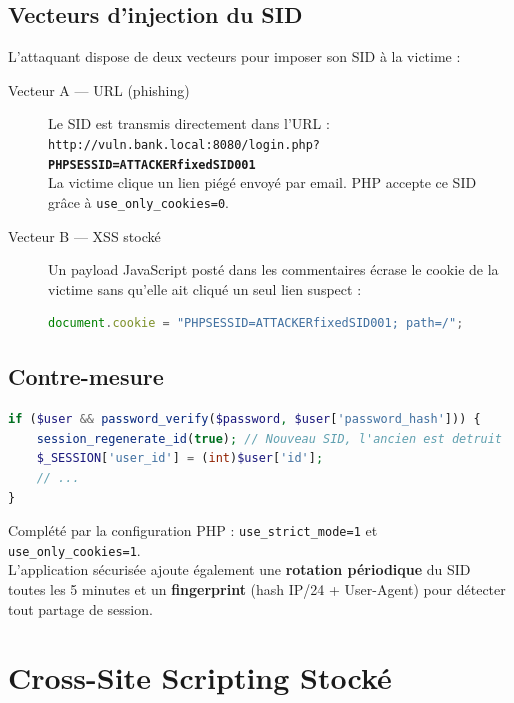\documentclass[12pt,a4paper]{report}
\begin{document}
\subsection{Vecteurs d'injection du SID}

L'attaquant dispose de deux vecteurs pour imposer son SID à la victime :

\begin{description}
  \item[Vecteur A — URL (phishing)] Le SID est transmis directement dans l'URL : \\
  \texttt{http://vuln.bank.local:8080/login.php?\textbf{PHPSESSID=ATTACKERfixedSID001}} \\
  La victime clique un lien piégé envoyé par email. PHP accepte ce SID grâce à \texttt{use\_only\_cookies=0}.

  \item[Vecteur B — XSS stocké] Un payload JavaScript posté dans les commentaires écrase le cookie de la victime sans qu'elle ait cliqué un seul lien suspect :
\begin{lstlisting}[language=JavaScript, caption={Payload XSS pour fixer le SID}]
document.cookie = "PHPSESSID=ATTACKERfixedSID001; path=/";
\end{lstlisting}
\end{description}

\subsection{Contre-mesure}

\begin{securebox}
\begin{lstlisting}[language=PHP, caption={login.php sécurisé — régénération du SID après authentification}]
if ($user && password_verify($password, $user['password_hash'])) {
    session_regenerate_id(true); // Nouveau SID, l'ancien est detruit
    $_SESSION['user_id'] = (int)$user['id'];
    // ...
}
\end{lstlisting}
Complété par la configuration PHP : \texttt{use\_strict\_mode=1} et \texttt{use\_only\_cookies=1}. \\
L'application sécurisée ajoute également une \textbf{rotation périodique} du SID toutes les 5 minutes et un \textbf{fingerprint} (hash IP/24 + User-Agent) pour détecter tout partage de session.
\end{securebox}

\section{Cross-Site Scripting Stocké}
\end{document}
